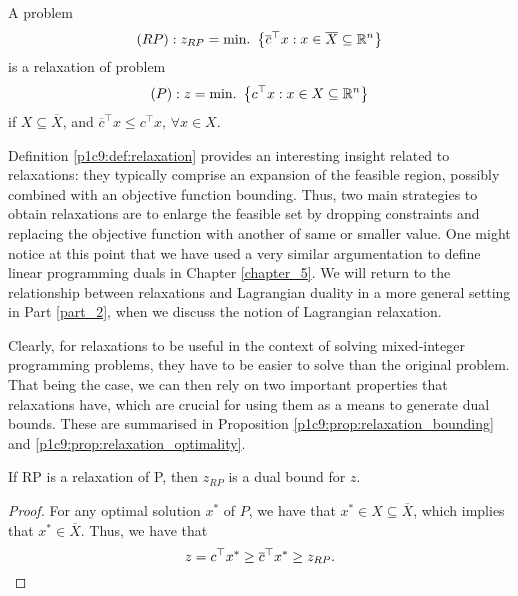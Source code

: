 \begin{definition}[Relaxation] \label{p1c9:def:relaxation}
	A problem 
	\begin{equation*}
	  (RP): z_{RP} = \mathop{\text{min.~}} \left\{ \overline{c}^\top x : x \in \overline{X} \subseteq \mathbb{R}^n \right \} 
	\end{equation*}
%
	is a relaxation of problem
	\begin{equation*}
	  (P): z = \mathop{\text{min.~}} \left\{ c^\top x : x \in X \subseteq \mathbb{R}^n \right \} 
	\end{equation*}
	if $X \subseteq \overline{X}$, and $\overline{c}^\top x \leq c^\top x$, $\forall x \in X$.
\end{definition}

Definition \ref{p1c9:def:relaxation} provides an interesting insight related to relaxations: they typically comprise an expansion of the feasible region, possibly combined with an objective function bounding. Thus, two main strategies to obtain relaxations are to enlarge the feasible set by dropping constraints and replacing the objective function with another of same or smaller value. One might notice at this point that we have used a very similar argumentation to define linear programming duals in Chapter \ref{chapter_5}. We will return to the relationship between relaxations and Lagrangian duality in a more general setting in Part \ref{part_2}, when we discuss the notion of Lagrangian relaxation.

Clearly, for relaxations to be useful in the context of solving mixed-integer programming problems, they have to be easier to solve than the original problem. That being the case, we can then rely on two important properties that relaxations have, which are crucial for using them as a means to generate dual bounds. These are summarised in Proposition \ref{p1c9:prop:relaxation_bounding} and \ref{p1c9:prop:relaxation_optimality}.

\begin{proposition} \label{p1c9:prop:relaxation_bounding}
	If RP is a relaxation of P, then $z_{RP}$ is a dual bound for $z$. 
\end{proposition}
    
\begin{proof} For any optimal solution $x^*$ of $P$, we have that $x^* \in X \subseteq \overline{X}$, which implies that $x^* \in \overline{X}$. Thus, we have that
  \begin{equation*}
  	 z = c^\top x^* \geq \overline{c}^\top x^* \geq z_{RP}.	\qedhere
  \end{equation*}
\end{proof}

